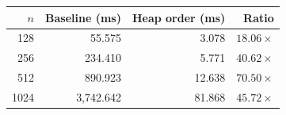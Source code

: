 \begin{tabular}{rrrr}
\toprule
$n$ & Baseline (ms) & Heap order (ms) & Ratio \\
\midrule
128 & 55.575 & 3.078 & $18.06\times$ \\
256 & 234.410 & 5.771 & $40.62\times$ \\
512 & 890.923 & 12.638 & $70.50\times$ \\
1024 & 3,742.642 & 81.868 & $45.72\times$ \\
\bottomrule
\end{tabular}

